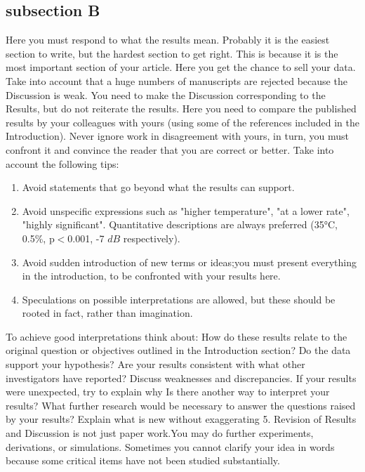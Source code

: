 \documentclass[a4paper, 10pt, conference]{ieeeconf}      %
\begin{document}
\subsection{subsection B}
Here you must respond to what the results mean. Probably it is the easiest section to write, but the hardest section to get right. This is because it is the most important section of your article. Here you get the chance to sell your data. Take into account that a huge numbers of manuscripts are rejected because the Discussion is weak.
You need to make the Discussion corresponding to the Results, but do not reiterate the results. Here you need to compare the published results by your colleagues with yours (using some of the references included in the Introduction). Never ignore work in disagreement with yours, in turn, you must confront it and convince the reader that you are correct or better.
Take into account the following tips:
\begin{enumerate}
\item Avoid statements that go beyond what the results can support.
\item Avoid unspecific expressions such as "higher temperature", "at a lower rate", "highly significant". Quantitative descriptions are always preferred (\ang{35}C, 0.5\%, p$<$0.001, -7 $dB$ respectively).
\item Avoid sudden introduction of new terms or ideas;you must present everything in the introduction, to be confronted with your results here.
\item Speculations on possible interpretations are allowed, but these should be rooted in fact, rather than imagination. 
\end{enumerate}
To achieve good interpretations think about:
How do these results relate to the original question or objectives outlined in the Introduction section?
Do the data support your hypothesis?
Are your results consistent with what other investigators have reported? Discuss weaknesses and discrepancies. If your results were unexpected, try to explain why
Is there another way to interpret your results?
What further research would be necessary to answer the questions raised by your results?
Explain what is new without exaggerating
5. Revision of Results and Discussion is not just paper work.You may do further experiments, derivations, or simulations. Sometimes you cannot clarify your idea in words because some critical items have not been studied substantially.
\end{document}
